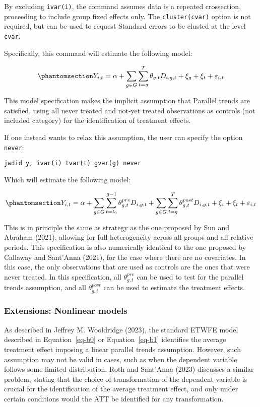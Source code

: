 \documentclass[
  letterpaper,
  DIV=11,
  numbers=noendperiod]{scrartcl}
\begin{document}
By excluding \texttt{ivar(i)}, the command assumes data is a repeated
crossection, proceeding to include group fixed effects only. The
\texttt{cluster(cvar)} option is not required, but can be used to
request Standard errors to be clusted at the level \texttt{cvar}.

Specifically, this command will estimate the following model:

\begin{equation}\phantomsection\label{eq-b1}{Y_{i,t} = \alpha + \sum_{g \in G} \sum_{t=g}^{T} \theta_{g,t} D_{i,g,t} + \xi_g + \xi_t + \varepsilon_{i,t}
}\end{equation}

This model specification makes the implicit assumption that Parallel
trends are satisfied, using all never treated and not-yet treated
observations as controls (not included category) for the identification
of treatment effects.

If one instead wants to relax this assumption, the user can specify the
option \texttt{never}:

\texttt{jwdid\ y,\ ivar(i)\ tvar(t)\ gvar(g)\ never}

Which will estimate the following model:

\begin{equation}\phantomsection\label{eq-b2}{Y_{i,t} = \alpha +  \sum_{g \in G} \sum_{t=t_0}^{g-1} \theta^{pre}_{g,t} D_{i,g,t}+ \sum_{g \in G} \sum_{t=g}^{T} \theta^{post}_{g,t} D_{i,g,t} + \xi_i + \xi_t + \varepsilon_{i,t}
}\end{equation}

This is in principle the same as strategy as the one proposed by Sun and
Abraham (2021), allowing for full heterogeneity across all groups and
all relative periods. This specification is also numerically identical
to the one proposed by Callaway and Sant'Anna (2021), for the case where
there are no covariates. In this case, the only observations that are
used as controls are the ones that were never treated. In this
specification, all \(\theta^{pre}_{g,t}\) can be used to test for the
parallel trends assumption, and all \(\theta^{post}_{g,t}\) can be used
to estimate the treatment effects.

\subsubsection{Extensions: Nonlinear
models}\label{extensions-nonlinear-models}

As described in Jeffrey M. Wooldridge (2023), the standard ETWFE model
described in Equation~\ref{eq-b0} or Equation~\ref{eq-b1} identifies the
average treatment effect imposing a linear parallel trends assumption.
However, such assumption may not be valid in cases, such as when the
dependent variable follows some limited distribution. Roth and Sant'Anna
(2023) discusses a similar problem, stating that the choice of
transformation of the dependent variable is crucial for the
identification of the average treatment effect, and only under certain
conditions would the ATT be identified for any transformation.
\end{document}
